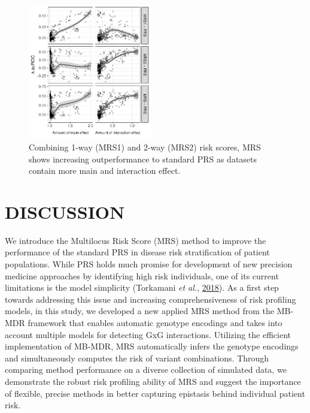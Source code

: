 \documentclass[a4paper,twoside, 9pt]{article}
\begin{document}
\begin{figure}
\centering
\includegraphics[width=0.48\textwidth]{images/improvements_train_ms.pdf}
\caption{Combining 1-way (MRS1) and 2-way (MRS2) risk scores, MRS shows
increasing outperformance to standard PRS as datasets contain more main
and interaction effect.\label{fig:improvements}}
\end{figure}


%
%
%
\section{\uppercase{Discussion}}\label{discussion}

\noindent We introduce the Multilocus Risk Score (MRS) method to improve the
performance of the standard PRS in disease risk stratification of
patient populations. While PRS holds much promise for development of new
precision medicine approaches by identifying high risk individuals, one of its current
limitations is the model simplicity (Torkamani \emph{et al.},
\protect\hyperlink{ref-1GK3F1BxE}{2018}). As a first step towards
addressing this issue and increasing comprehensiveness of risk profiling
models, in this study, we developed a new applied MRS method from the
MB-MDR framework that enables automatic genotype encodings and takes
into account multiple models for detecting GxG interactions. Utilizing
the efficient implementation of MB-MDR, MRS automatically infers the
genotype encodings and simultaneously computes the risk of variant
combinations. Through comparing method performance on a diverse
collection of simulated data, we demonstrate the robust risk
profiling ability of MRS and suggest the importance of flexible, precise
methods in better capturing epistasis behind individual patient risk.
\end{document}
